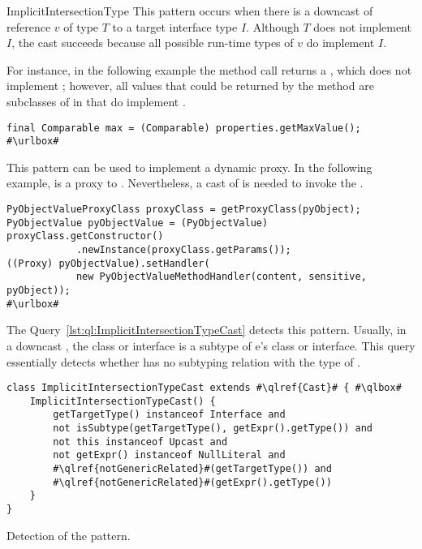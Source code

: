 \begin{pattern}{ImplicitIntersectionType}
This pattern occurs when there is a downcast of reference $v$ of type $T$ to a target interface type $I$.
Although $T$ does not implement $I$, 
the cast succeeds because all possible run-time types of $v$ do implement $I$.

\instances{}
For instance, in the following example the method call returns a ,
which does not implement ; however,
all values that could be returned by the method are subclasses of 
in  that do implement .

\def\urlvar{http://bit.ly/senbox_org_snap_desktop_2FQOt4v}
\begin{verbatim}
final Comparable max = (Comparable) properties.getMaxValue();
#\urlbox#
\end{verbatim}

This pattern can be used to implement a dynamic proxy.
In the following example,
 is a proxy to .
Nevertheless, a cast of  is needed to invoke the .

\def\urlvar{http://bit.ly/CloudSlang_cloud_slang_2EkgP4l}
\begin{verbatim}
PyObjectValueProxyClass proxyClass = getProxyClass(pyObject);
PyObjectValue pyObjectValue = (PyObjectValue) proxyClass.getConstructor()
            .newInstance(proxyClass.getParams());
((Proxy) pyObjectValue).setHandler(
            new PyObjectValueMethodHandler(content, sensitive, pyObject));
#\urlbox#
\end{verbatim}


\detection{}
The Query~\ref{lst:ql:ImplicitIntersectionTypeCast} detects this pattern.
Usually, in a downcast , the class or interface  is a subtype of {e}'s class or interface.
This query essentially detects whether  has no subtyping relation with the type of .

\begin{listing}
\begin{verbatim}
class ImplicitIntersectionTypeCast extends #\qlref{Cast}# { #\qlbox#
	ImplicitIntersectionTypeCast() {
		getTargetType() instanceof Interface and
		not isSubtype(getTargetType(), getExpr().getType()) and
		not this instanceof Upcast and
		not getExpr() instanceof NullLiteral and
		#\qlref{notGenericRelated}#(getTargetType()) and
		#\qlref{notGenericRelated}#(getExpr().getType())
	}
}
\end{verbatim}
\caption{Detection of the \thisp{} pattern.}
\label{lst:ql:ImplicitIntersectionTypeCast}
\end{listing}



\end{pattern}
